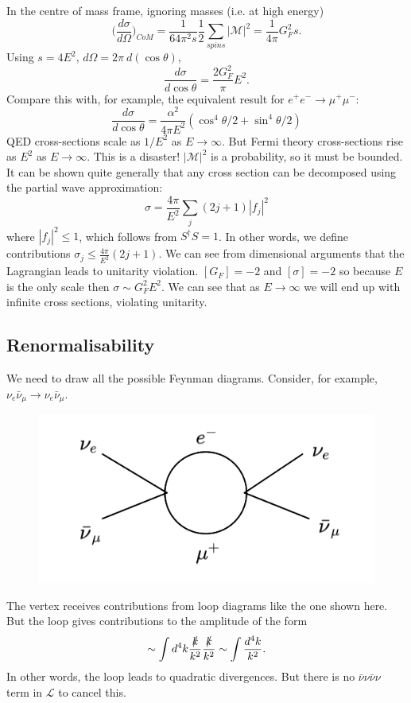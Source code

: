In the centre of mass frame, ignoring masses (i.e. at high energy)
\begin{equation}
\bigg(\frac{d\sigma}{d\Omega}\bigg)_{CoM} = \frac{1}{64\pi^2s}\frac{1}{2}\sum_{spins}|\mathcal{M}|^2 = \frac{1}{4\pi}G_F^2s.
\end{equation}
Using $s=4E^2$, $d\Omega = 2\pi\ d(\cos\theta)$,
\begin{equation}
\frac{d\sigma}{d\cos\theta} = \frac{2G_F^2}{\pi}E^2.
\end{equation}
Compare this with, for example, the equivalent result for $e^+e^- \to \mu^+\mu^-$:
\begin{equation}
\frac{d\sigma}{d\cos\theta} = \frac{\alpha^2}{4\pi E^2}(\cos^4\theta/2 + \sin^4\theta/2)
\end{equation}
QED cross-sections scale as $1/E^2$ as $E \to \infty$. But Fermi theory cross-sections rise as $E^2$ as $E \to \infty$. This is a disaster! $|\mathcal{M}|^2$ is a probability, so it must be bounded. It can be shown quite generally that any cross section can be decomposed using the partial wave approximation:
\begin{equation}
\sigma = \frac{4\pi}{E^2}\sum_j(2j+1)|f_j|^2
\end{equation}
where $|f_j|^2 \leq 1$, which follows from $S^\dagger S =1$. In other words, we define contributions $\sigma_j \leq \frac{4\pi}{E^2}(2j+1)$. We can see from dimensional arguments that the Lagrangian leads to unitarity violation. $[G_F]=-2$ and $[\sigma]=-2$ so because $E$ is the only scale then $\sigma \sim G_F^2E^2$. We can see that as $E \to \infty$ we will end up with infinite cross sections, violating unitarity. 
%
\subsection{Renormalisability}
%
We need to draw all the possible Feynman diagrams. Consider, for example, $\nu_e\bar{\nu}_\mu \to \nu_e\bar{\nu}_\mu$.
\begin{figure}
  \centering
  \includegraphics[width=\linewidth]{figs/diag_6.png}
\end{figure}
The vertex receives contributions from loop diagrams like the one shown here. But the loop gives contributions to the amplitude of the form
\begin{equation}
\sim \int d^4k \frac{\slashed{k}}{k^2}\frac{\slashed{k}}{k^2} \sim \int \frac{d^4k}{k^2}.
\end{equation}
In other words, the loop leads to quadratic divergences. But there is no $\bar{\nu}\nu\bar{\nu}\nu$ term in $\mathcal{L}$ to cancel this.
%
